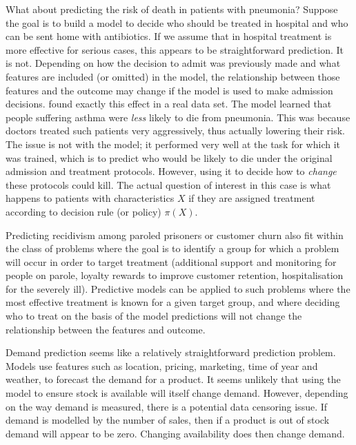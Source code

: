 \documentclass[11pt,a4paper,twoside]{report}
\theoremstyle{plain}
\theoremstyle{definition}
\begin{document}
What about predicting the risk of death in patients with pneumonia? Suppose the goal is to build a model to decide who should be treated in hospital and who can be sent home with antibiotics. If we assume that in hospital treatment is more effective for serious cases, this appears to be straightforward prediction. It is not. Depending on how the decision to admit was previously made and what features are included (or omitted) in the model, the relationship between those features and the outcome may change if the model is used to make admission decisions. \citet{Caruana2015} found exactly this effect in a real data set. The model learned that people suffering asthma were \emph{less} likely to die from pneumonia. This was because doctors treated such patients very aggressively, thus actually lowering their risk. The issue is not with the model; it performed very well at the task for which it was trained, which is to predict who would be likely to die under the original admission and treatment protocols. However, using it to decide how to \emph{change} these protocols could kill. The actual question of interest in this case is what happens to patients with characteristics $X$ if they are assigned treatment according to decision rule (or policy) $\pi(X)$. 

Predicting recidivism among paroled prisoners or customer churn also fit within the class of problems where the goal is to identify a group for which a problem will occur in order to target treatment (additional support and monitoring for people on parole, loyalty rewards to improve customer retention, hospitalisation for the severely ill). Predictive models can be applied to such problems where the most effective treatment is known for a given target group, and where deciding who to treat on the basis of the model predictions will not change the relationship between the features and outcome.

Demand prediction seems like a relatively straightforward prediction problem. Models use features such as location, pricing, marketing, time of year and weather, to forecast the demand for a product. It seems unlikely that using the model to ensure stock is available will itself change demand. However, depending on the way demand is measured, there is a potential data censoring issue. If demand is modelled by the number of sales, then if a product is out of stock demand will appear to be zero. Changing availability does then change demand.
   
\end{document}
